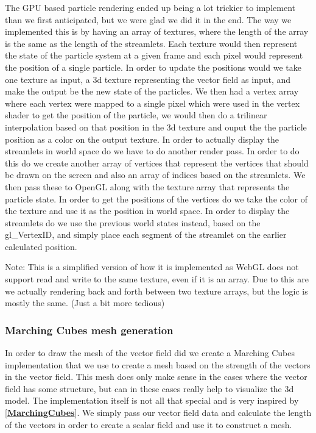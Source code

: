 \documentclass{article}
\newcommand{\reference}[1]{[\hyperref[ref:#1]{\textbf{#1}}]}
\begin{document}
The GPU based particle rendering ended up being a lot trickier to implement than we first anticipated, but we were glad we did it in the end. The way we implemented this is by having an array of textures, where the length of the array is the same as the length of the streamlets. Each texture would then represent the state of the particle system at a given frame and each pixel would represent the position of a single particle. In order to update the positions would we take one texture as input, a 3d texture representing the vector field as input, and make the output be the new state of the particles. We then had a vertex array where each vertex were mapped to a single pixel which were used in the vertex shader to get the position of the particle, we would then do a trilinear interpolation based on that position in the 3d texture and ouput the the particle position as a color on the output texture. In order to actually display the streamlets in world space do we have to do another render pass. In order to do this do we create another array of vertices that represent the vertices that should be drawn on the screen and also an array of indices based on the streamlets. We then pass these to OpenGL along with the texture array that represents the particle state. In order to get the positions of the vertices do we take the color of the texture and use it as the position in world space. In order to display the streamlets do we use the previous world states instead, based on the gl_VertexID, and simply place each segment of the streamlet on the earlier calculated position.


Note: This is a simplified version of how it is implemented as WebGL does not support read and write to the same texture, even if it is an array. Due to this are we actually rendering back and forth between two texture arrays, but the logic is mostly the same. (Just a bit more tedious)

\subsubsection{Marching Cubes mesh generation}

In order to draw the mesh of the vector field did we create a Marching Cubes implementation that we use to create a mesh based on the strength of the vectors in the vector field. This mesh does only make sense in the cases where the vector field has some structure, but can in these cases really help to visualize the 3d model. The implementation itself is not all that special and is very inspired by \reference{MarchingCubes}. We simply pass our vector field data and calculate the length of the vectors in order to create a scalar field and use it to construct a mesh. 
\end{document}

